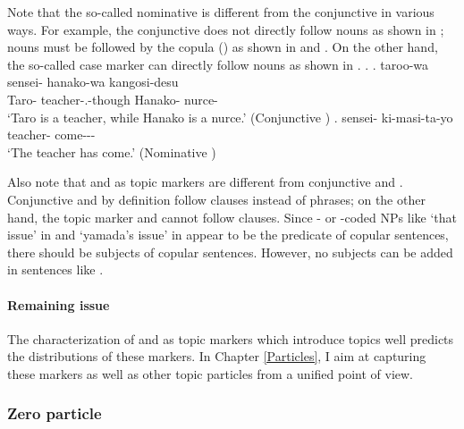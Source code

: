 Note that the so-called nominative  is different from
the conjunctive  in various ways.
For example,
the conjunctive  does not directly follow nouns
as shown in \Last[a];
nouns must be followed by the copula () as shown in \Last[a] and \Next[a].
On the other hand,
the so-called case marker  can directly follow nouns
as shown in \Next[b].
%
\ex.
 \ag. taroo-wa sensei- hanako-wa kangosi-desu \\
      Taro- teacher-.-though Hanako- nurce- \\
      `Taro is a teacher, while Hanako is a nurce.'
      \hfill{(Conjunctive )}
 \bg. sensei- ki-masi-ta-yo \\
      teacher- come--- \\
      `The teacher has come.'
      \hfill{(Nominative )}


Also note that  and  as topic markers are different from
conjunctive  and .
Conjunctive  and  by definition follow clauses
instead of phrases;
on the other hand,
the topic marker  and  cannot follow clauses.
Since - or -coded NPs like  `that issue' in \LLast[a] and  `yamada's issue' in \LLast[b]
appear to be the predicate of copular sentences,
there should be subjects of copular sentences.
However, no subjects can be added in sentences like \LLast.

\paragraph{Remaining issue}

The characterization of  and  as topic markers
which introduce topics well predicts the distributions of these markers.
In Chapter \ref{Particles},
I aim at capturing these markers as well as other topic particles from a unified point of view.


\subsubsection{Zero particle}\label{BackSubSubZero}

